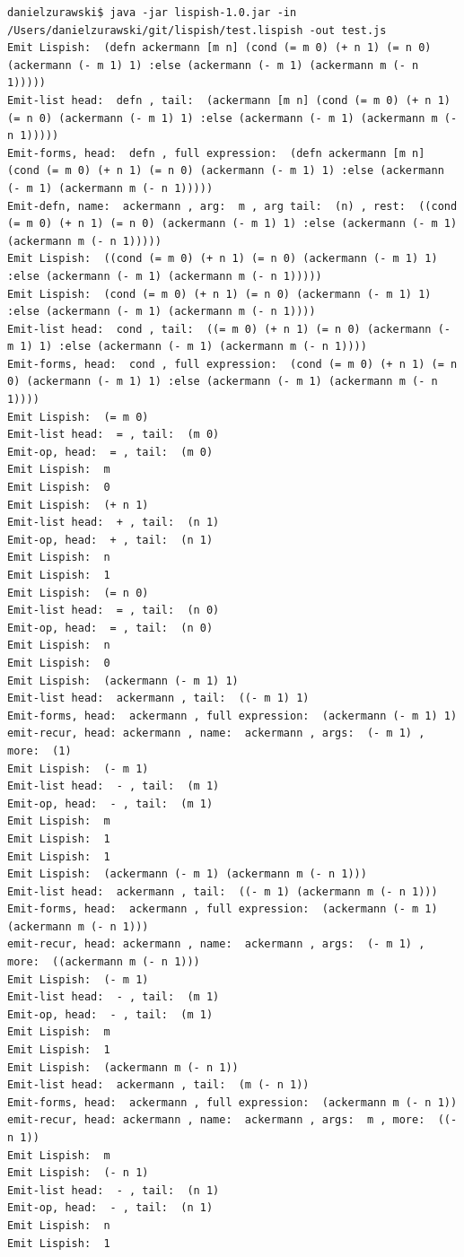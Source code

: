 \begin{verbatim}
danielzurawski$ java -jar lispish-1.0.jar -in /Users/danielzurawski/git/lispish/test.lispish -out test.js
Emit Lispish:  (defn ackermann [m n] (cond (= m 0) (+ n 1) (= n 0) (ackermann (- m 1) 1) :else (ackermann (- m 1) (ackermann m (- n 1)))))
Emit-list head:  defn , tail:  (ackermann [m n] (cond (= m 0) (+ n 1) (= n 0) (ackermann (- m 1) 1) :else (ackermann (- m 1) (ackermann m (- n 1)))))
Emit-forms, head:  defn , full expression:  (defn ackermann [m n] (cond (= m 0) (+ n 1) (= n 0) (ackermann (- m 1) 1) :else (ackermann (- m 1) (ackermann m (- n 1)))))
Emit-defn, name:  ackermann , arg:  m , arg tail:  (n) , rest:  ((cond (= m 0) (+ n 1) (= n 0) (ackermann (- m 1) 1) :else (ackermann (- m 1) (ackermann m (- n 1)))))
Emit Lispish:  ((cond (= m 0) (+ n 1) (= n 0) (ackermann (- m 1) 1) :else (ackermann (- m 1) (ackermann m (- n 1)))))
Emit Lispish:  (cond (= m 0) (+ n 1) (= n 0) (ackermann (- m 1) 1) :else (ackermann (- m 1) (ackermann m (- n 1))))
Emit-list head:  cond , tail:  ((= m 0) (+ n 1) (= n 0) (ackermann (- m 1) 1) :else (ackermann (- m 1) (ackermann m (- n 1))))
Emit-forms, head:  cond , full expression:  (cond (= m 0) (+ n 1) (= n 0) (ackermann (- m 1) 1) :else (ackermann (- m 1) (ackermann m (- n 1))))
Emit Lispish:  (= m 0)
Emit-list head:  = , tail:  (m 0)
Emit-op, head:  = , tail:  (m 0)
Emit Lispish:  m
Emit Lispish:  0
Emit Lispish:  (+ n 1)
Emit-list head:  + , tail:  (n 1)
Emit-op, head:  + , tail:  (n 1)
Emit Lispish:  n
Emit Lispish:  1
Emit Lispish:  (= n 0)
Emit-list head:  = , tail:  (n 0)
Emit-op, head:  = , tail:  (n 0)
Emit Lispish:  n
Emit Lispish:  0
Emit Lispish:  (ackermann (- m 1) 1)
Emit-list head:  ackermann , tail:  ((- m 1) 1)
Emit-forms, head:  ackermann , full expression:  (ackermann (- m 1) 1)
emit-recur, head: ackermann , name:  ackermann , args:  (- m 1) , more:  (1)
Emit Lispish:  (- m 1)
Emit-list head:  - , tail:  (m 1)
Emit-op, head:  - , tail:  (m 1)
Emit Lispish:  m
Emit Lispish:  1
Emit Lispish:  1
Emit Lispish:  (ackermann (- m 1) (ackermann m (- n 1)))
Emit-list head:  ackermann , tail:  ((- m 1) (ackermann m (- n 1)))
Emit-forms, head:  ackermann , full expression:  (ackermann (- m 1) (ackermann m (- n 1)))
emit-recur, head: ackermann , name:  ackermann , args:  (- m 1) , more:  ((ackermann m (- n 1)))
Emit Lispish:  (- m 1)
Emit-list head:  - , tail:  (m 1)
Emit-op, head:  - , tail:  (m 1)
Emit Lispish:  m
Emit Lispish:  1
Emit Lispish:  (ackermann m (- n 1))
Emit-list head:  ackermann , tail:  (m (- n 1))
Emit-forms, head:  ackermann , full expression:  (ackermann m (- n 1))
emit-recur, head: ackermann , name:  ackermann , args:  m , more:  ((- n 1))
Emit Lispish:  m
Emit Lispish:  (- n 1)
Emit-list head:  - , tail:  (n 1)
Emit-op, head:  - , tail:  (n 1)
Emit Lispish:  n
Emit Lispish:  1
\end{verbatim}

